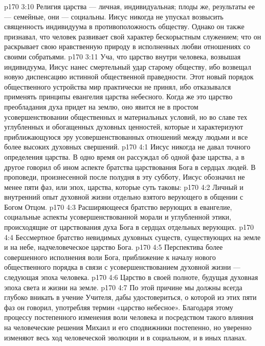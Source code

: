 \vs p170 3:10 Религия царства --- личная, индивидуальная; плоды же, результаты ее --- семейные, они --- социальны. Иисус никогда не упускал возвысить священность индивидуума в противоположность обществу. Однако он также признавал, что человек развивает свой характер бескорыстным служением; что он раскрывает свою нравственную природу в исполненных любви отношениях со своими собратьями.
\vs p170 3:11 Уча, что царство внутри человека, возвышая индивидуума, Иисус нанес смертельный удар старому обществу, ибо возвещал новую диспенсацию истинной общественной праведности. Этот новый порядок общественного устройства мир практически не принял, ибо отказывался применять принципы евангелия царства небесного. Когда же это царство преобладания духа придет на землю, оно явится не в простом усовершенствовании общественных и материальных условий, но во славе тех углубленных и обогащенных духовных ценностей, которые и характеризуют приближающуюся эру усовершенствованных отношений между людьми и все более высоких духовных свершений.
\vs p170 4:1 Иисус никогда не давал точного определения царства. В одно время он рассуждал об одной фазе царства, а в другое говорил об ином аспекте братства царствования Бога в сердцах людей. В проповеди, произнесенной после полудня в эту субботу, Иисус обозначил не менее пяти фаз, или эпох, царства, которые суть таковы:
\vs p170 4:2 \bibnobreakspace Личный и внутренний опыт духовной жизни отдельно взятого верующего в общении с Богом Отцом.
\vs p170 4:3 \pc {}\bibnobreakspace Расширяющееся братство верующих в евангелие, социальные аспекты усовершенствованной морали и углубленной этики, происходящие от царствования духа Бога в сердцах отдельных верующих.
\vs p170 4:4 \pc {}\bibnobreakspace Бессмертное братство невидимых духовных существ, существующих на земле и на небе, надчеловеческое царство Бога.
\vs p170 4:5 \pc {}\bibnobreakspace Перспектива более совершенного исполнения воли Бога, приближение к началу нового общественного порядка в связи с усовершенствованием духовной жизни --- следующая эпоха человека.
\vs p170 4:6 \pc {}\bibnobreakspace Царство в своей полноте, будущая духовная эпоха света и жизни на земле.
\vs p170 4:7 \pc По этой причине мы должны всегда глубоко вникать в учение Учителя, дабы удостовериться, о которой из этих пяти фаз он говорил, употребляя термин «царство небесное». Благодаря этому процессу постепенного изменения воли человека и посредством такого влияния на человеческие решения Михаил и его сподвижники постепенно, но уверенно изменяют весь ход человеческой эволюции и в социальном, и в иных планах.
